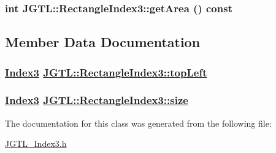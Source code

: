 \hypertarget{class_j_g_t_l_1_1_rectangle_index3_fa79fc376e7ba91e790bd613a77a8796}{
\subsubsection[getArea]{\setlength{\rightskip}{0pt plus 5cm}int JGTL::Rectangle\-Index3::get\-Area () const}}
\label{class_j_g_t_l_1_1_rectangle_index3_fa79fc376e7ba91e790bd613a77a8796}




\subsection{Member Data Documentation}
\hypertarget{class_j_g_t_l_1_1_rectangle_index3_3b7944ac74165c86d84e249348d123a0}{
\subsubsection[topLeft]{\setlength{\rightskip}{0pt plus 5cm}\hyperlink{class_j_g_t_l_1_1_index3}{Index3} \hyperlink{class_j_g_t_l_1_1_rectangle_index3_3b7944ac74165c86d84e249348d123a0}{JGTL::Rectangle\-Index3::top\-Left}}}
\label{class_j_g_t_l_1_1_rectangle_index3_3b7944ac74165c86d84e249348d123a0}


\hypertarget{class_j_g_t_l_1_1_rectangle_index3_a6c4a7cd479ca23b7a3063e2abc1c6aa}{
\subsubsection[size]{\setlength{\rightskip}{0pt plus 5cm}\hyperlink{class_j_g_t_l_1_1_index3}{Index3} \hyperlink{class_j_g_t_l_1_1_rectangle_index3_a6c4a7cd479ca23b7a3063e2abc1c6aa}{JGTL::Rectangle\-Index3::size}}}
\label{class_j_g_t_l_1_1_rectangle_index3_a6c4a7cd479ca23b7a3063e2abc1c6aa}




The documentation for this class was generated from the following file:\begin{CompactItemize}
\item 
\hyperlink{_j_g_t_l___index3_8h}{JGTL\_\-Index3.h}\end{CompactItemize}
